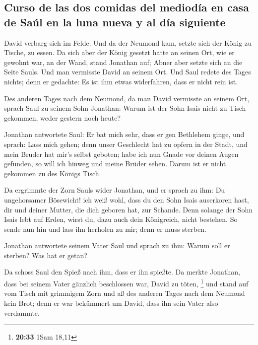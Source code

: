 \hypertarget{curso-de-las-dos-comidas-del-medioduxeda-en-casa-de-sauxfal-en-la-luna-nueva-y-al-duxeda-siguiente}{%
\subsection{Curso de las dos comidas del mediodía en casa de Saúl en la
luna nueva y al día
siguiente}\label{curso-de-las-dos-comidas-del-medioduxeda-en-casa-de-sauxfal-en-la-luna-nueva-y-al-duxeda-siguiente}}

 David verbarg sich im Felde. Und da der Neumond kam,
setzte sich der König zu Tische, zu essen.  Da sich aber
der König gesetzt hatte an seinen Ort, wie er gewohnt war, an der Wand,
stand Jonathan auf; Abner aber setzte sich an die Seite Sauls. Und man
vermisste David an seinem Ort.  Und Saul redete des Tages
nichts; denn er gedachte: Es ist ihm etwas widerfahren, dass er nicht
rein ist.

 Des anderen Tages nach dem Neumond, da man David
vermisste an seinem Ort, sprach Saul zu seinem Sohn Jonathan: Warum ist
der Sohn Isais nicht zu Tisch gekommen, weder gestern noch heute?

 Jonathan antwortete Saul: Er bat mich sehr, dass er gen
Bethlehem ginge,  und sprach: Lass mich gehen; denn unser
Geschlecht hat zu opfern in der Stadt, und mein Bruder hat mir's selbst
geboten; habe ich nun Gnade vor deinen Augen gefunden, so will ich
hinweg und meine Brüder sehen. Darum ist er nicht gekommen zu des Königs
Tisch.

 Da ergrimmte der Zorn Sauls wider Jonathan, und er
sprach zu ihm: Du ungehorsamer Bösewicht! ich weiß wohl, dass du den
Sohn Isais auserkoren hast, dir und deiner Mutter, die dich geboren hat,
zur Schande.  Denn solange der Sohn Isais lebt auf Erden,
wirst du, dazu auch dein Königreich, nicht bestehen. So sende nun hin
und lass ihn herholen zu mir; denn er muss sterben.

 Jonathan antwortete seinem Vater Saul und sprach zu ihm:
Warum soll er sterben? Was hat er getan?

 Da schoss Saul den Spieß nach ihm, dass er ihn spießte.
Da merkte Jonathan, dass bei seinem Vater gänzlich beschlossen war,
David zu töten, \footnote{\textbf{20:33} 1Sam 18,11}  und
stand auf vom Tisch mit grimmigem Zorn und aß des anderen Tages nach dem
Neumond kein Brot; denn er war bekümmert um David, dass ihn sein Vater
also verdammte.


